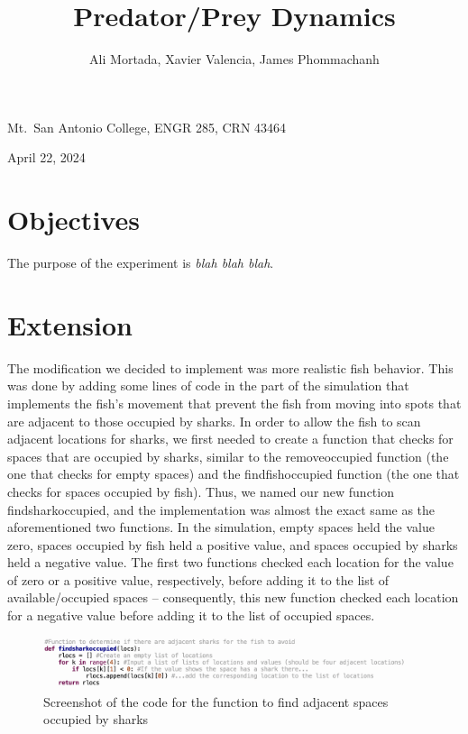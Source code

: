 \documentclass[12pt]{iopart} %
\begin{document}
\title{Predator/Prey Dynamics}
\author{Ali Mortada, Xavier Valencia, James Phommachanh}
\vspace{10pt}
\begin{indented}
  \item[]Mt.~San Antonio College, ENGR 285, CRN 43464
  \item[]April 22, 2024
\end{indented}
\newpage

\section{Objectives}

The purpose of the experiment is \emph{blah blah blah}.


\section{Extension}


The modification we decided to implement was more realistic fish behavior. 
This was done by adding some lines of code in the part of the simulation that implements the fish’s movement that prevent the fish from moving into spots that are adjacent to those occupied by sharks. 
In order to allow the fish to scan adjacent locations for sharks, we first needed to create a function that checks for spaces that are occupied by sharks, similar to the removeoccupied function (the one that checks for empty spaces) and the findfishoccupied function (the one that checks for spaces occupied by fish). 
Thus, we named our new function findsharkoccupied, and the implementation was almost the exact same as the aforementioned two functions. 
In the simulation, empty spaces held the value zero, spaces occupied by fish held a positive value, and spaces occupied by sharks held a negative value. 
The first two functions checked each location for the value of zero or a positive value, respectively, before adding it to the list of available/occupied spaces – consequently, this new function checked each location for a negative value before adding it to the list of occupied spaces.


\begin{figure}[htbp]
  \begin{center}
  \item[]\includegraphics[width=0.95\textwidth]{findSharkOccupied.png}
  \caption{\label{fig:findSharkOccupied}
  Screenshot of the code for the function to find adjacent spaces occupied by sharks
  }
  \end{center}
\end{figure}
\end{document}

